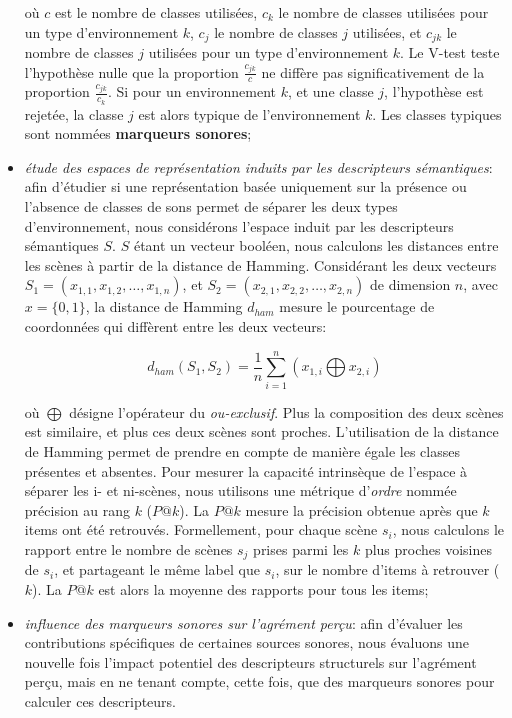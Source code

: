 \documentclass[twoside,twocolumn]{article}
\begin{document}
\begin{itemize}
où $c$ est le nombre de classes utilisées, $c_k$ le nombre de classes utilisées pour un type d'environnement $k$, $c_j$ le nombre de classes $j$ utilisées, et $c_{jk}$ le nombre de classes $j$ utilisées pour un type d'environnement $k$. Le V-test teste l'hypothèse nulle que la proportion $\frac{c_{jk}}{c}$ ne diffère pas significativement de la proportion $\frac{c_{jk}}{c_k}$. Si pour un environnement $k$, et une classe $j$, l'hypothèse est rejetée, la classe $j$ est alors typique de l'environnement $k$. Les classes typiques sont nommées \textbf{marqueurs sonores};

\item \emph{étude des espaces de représentation induits par les descripteurs sémantiques}: afin d'étudier si une représentation basée uniquement sur la présence ou l'absence de classes de sons permet de séparer les deux types d'environnement, nous considérons l'espace induit par les descripteurs sémantiques $S$. $S$ étant un vecteur booléen, nous calculons les distances entre les scènes à partir de la distance de Hamming. Considérant les deux vecteurs $S_1=(x_{1,1},x_{1,2},\ldots,x_{1,n})$, et $S_2=(x_{2,1},x_{2,2},\ldots,x_{2,n})$ de dimension $n$, avec $x=\lbrace 0,1\rbrace$, la distance de Hamming $d_{ham}$ mesure le pourcentage de coordonnées qui diffèrent entre les deux vecteurs:

\begin{equation*}
d_{ham}(S_1,S_2)=\dfrac{1}{n}\sum_{i=1}^{n} (x_{1,i} \bigoplus x_{2,i})
\end{equation*}

où $\bigoplus$ désigne l'opérateur du \emph{ou-exclusif}. Plus la composition des deux scènes est similaire, et plus ces deux scènes sont proches. L'utilisation de la distance de Hamming permet de prendre en compte de manière égale les classes présentes et absentes. Pour mesurer la capacité intrinsèque de l'espace à séparer les i- et ni-scènes, nous utilisons une métrique d'\emph{ordre} nommée précision au rang $k$ ($P@k$). La $P@k$ mesure la précision obtenue après que $k$ items ont été retrouvés. Formellement, pour chaque scène $s_i$, nous calculons le rapport entre le nombre de scènes $s_j$ prises parmi les $k$ plus proches voisines de $s_i$, et partageant le même label que $s_i$, sur le nombre d'items à retrouver ($k$). La $P@k$ est alors la moyenne des rapports pour tous les items;

\item \emph{influence des marqueurs sonores sur l'agrément perçu}: afin d'évaluer les contributions spécifiques de certaines sources sonores, nous évaluons une nouvelle fois l'impact potentiel des descripteurs structurels sur l'agrément perçu, mais en ne tenant compte, cette fois, que des marqueurs sonores pour calculer ces descripteurs.
\end{itemize}
\end{document}
